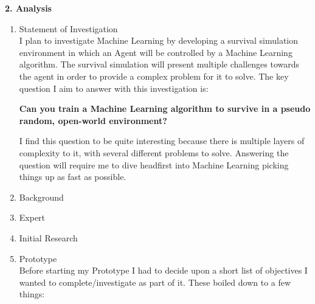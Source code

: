 \begin{flushleft}
    \huge
    \textbf{2. Analysis}
    \vspace{0.1cm}

    \Large
    \begin{enumerate}
        \item {\Large Statement of Investigation} \\
            \large
            I plan to investigate Machine Learning by developing a survival simulation environment 
            in which an Agent will be controlled by a Machine Learning algorithm. 
            The survival simulation will present multiple challenges towards the agent 
            in order to provide a complex problem for it to solve. 
            The key question I aim to answer with this investigation is:

            \vspace{0.3cm}

            \begin{center}
            \textbf{Can you train a Machine Learning algorithm to survive in a pseudo random, open-world environment?}
            \end{center}

            \vspace{0.3cm}

            I find this question to be quite interesting because there is multiple layers of complexity to it, 
            with several different problems to solve. Answering the question will require me to dive headfirst into 
            Machine Learning picking things up as fast as possible.

            \pagebreak
        \item {\Large Background} \\

        \item {\Large Expert} \\

        \item {\Large Initial Research} \\

            \pagebreak
        \item {\Large Prototype} \\
            \large
            Before starting my Prototype I had to decide upon a short list of objectives I wanted to 
            complete/investigate as part of it. These boiled down to a few things:


\end{enumerate}
\end{flushleft}
